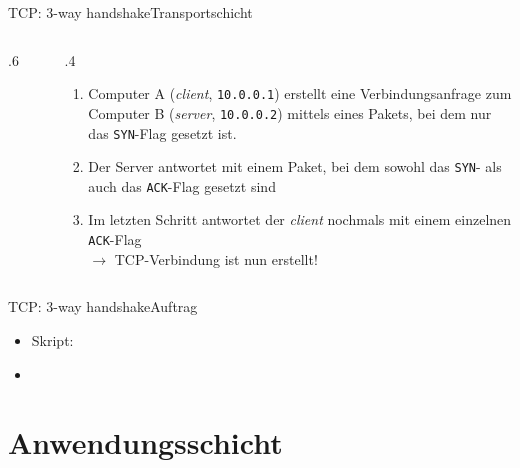 \begin{frame}[fragile]{\faHandshake{} \acrshort{TCP}: 3-way handshake}{Transportschicht}
    \begin{columns}[c]
        \begin{column}{.6\textwidth}
            \begin{figure}[H]
                \centering
            \end{figure}
        \end{column}\vrule{}
        \begin{column}{.4\textwidth}
            \footnotesize
            \begin{enumerate}
                \item Computer A (\textit{client}, \texttt{10.0.0.1}) erstellt eine Verbindungsanfrage zum Computer B (\textit{server}, \texttt{10.0.0.2}) mittels eines Pakets, bei dem nur das \texttt{SYN}-Flag gesetzt ist.
                \item Der Server antwortet mit einem Paket, bei dem sowohl das \texttt{SYN}- als auch das \texttt{ACK}-Flag gesetzt sind
                \item Im letzten Schritt antwortet der \textit{client} nochmals mit einem einzelnen \texttt{ACK}-Flag\\
                      $\rightarrow$ \acrshort{TCP}-Verbindung ist nun erstellt!
            \end{enumerate}
        \end{column}
    \end{columns}
\end{frame}

\begin{frame}[fragile]{\faHandshake{} \acrshort{TCP}: 3-way handshake}{Auftrag}
    \begin{itemize}
        \item Skript: 
        \item {}
    \end{itemize}
\end{frame}


\section{Anwendungsschicht}

